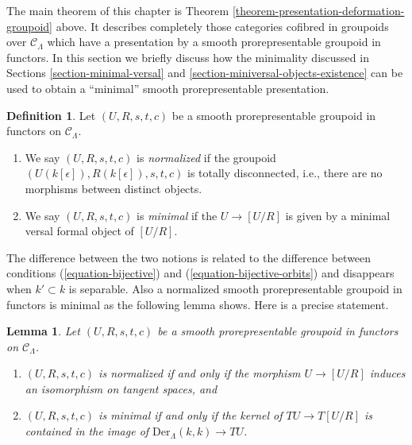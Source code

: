 \documentclass{stacks-project}
\theoremstyle{plain}
\newtheorem{lemma}[subsection]{Lemma}
\theoremstyle{definition}
\newtheorem{definition}[subsection]{Definition}
\theoremstyle{remark}
\numberwithin{equation}{subsection}
\begin{document}
\noindent
The main theorem of this chapter is
Theorem \ref{theorem-presentation-deformation-groupoid}
above. It describes completely those categories cofibred in groupoids
over $\mathcal{C}_\Lambda$ which have a presentation by a
smooth prorepresentable groupoid in functors. In this section we briefly
discuss how the minimality discussed in
Sections \ref{section-minimal-versal} and
\ref{section-miniversal-objects-existence}
can be used to obtain a ``minimal'' smooth prorepresentable presentation.

\begin{definition}
\label{definition-minimal-groupoid-in-functors}
Let $(U, R, s, t, c)$ be a smooth prorepresentable groupoid in functors
on $\mathcal{C}_\Lambda$.
\begin{enumerate}
\item We say $(U, R, s, t, c)$ is {\it normalized} if the groupoid
$(U(k[\epsilon]), R(k[\epsilon]), s, t, c)$ is totally disconnected,
i.e., there are no morphisms between distinct objects.
\item We say $(U, R, s, t, c)$ is {\it minimal} if the $U \to [U/R]$
is given by a minimal versal formal object of $[U/R]$.
\end{enumerate}
\end{definition}

\noindent
The difference between the two notions is related to the difference between
conditions (\ref{equation-bijective}) and (\ref{equation-bijective-orbits})
and disappears when $k' \subset k$ is separable. Also a
normalized smooth prorepresentable groupoid in functors is minimal
as the following lemma shows. Here is a precise statement.

\begin{lemma}
\label{lemma-characterize-minimal-groupoid-in-functors}
Let $(U, R, s, t, c)$ be a smooth prorepresentable groupoid in
functors on $\mathcal{C}_\Lambda$.
\begin{enumerate}
\item $(U, R, s, t, c)$ is normalized if and only if the morphism
$U \to [U/R]$ induces an isomorphism on tangent spaces, and
\item $(U, R, s, t, c)$ is minimal if and only if the kernel of
$TU \to T[U/R]$ is contained in the image of
$\text{Der}_\Lambda(k, k) \to TU$.
\end{enumerate}
\end{lemma}
\end{document}
